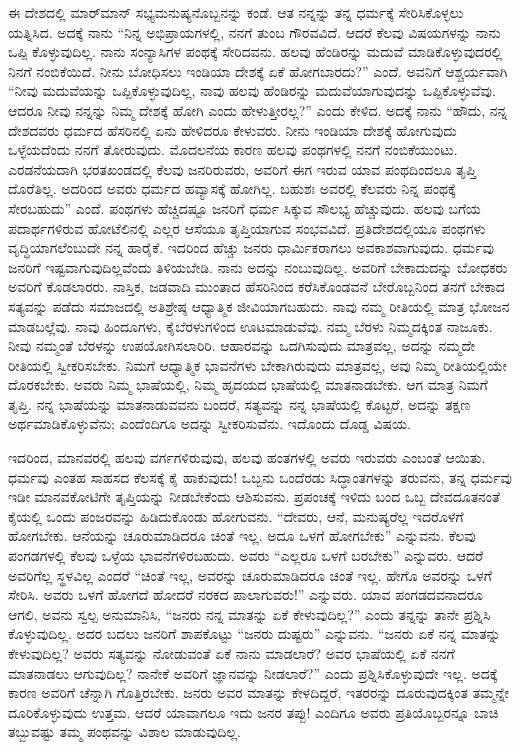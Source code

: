 ಈ ದೇಶದಲ್ಲಿ ಮಾರ್​ಮಾನ್​ ಸಭ್ಯಮನುಷ್ಯನೊಬ್ಬನನ್ನು ಕಂಡೆ. ಆತ ನನ್ನನ್ನು ತನ್ನ ಧರ್ಮಕ್ಕೆ ಸೇರಿಸಿಕೊಳ್ಳಲು ಯತ್ನಿಸಿದ. ಅದಕ್ಕೆ ನಾನು “ನಿನ್ನ ಅಭಿಪ್ರಾಯಗಳಲ್ಲಿ, ನನಗೆ ತುಂಬ ಗೌರವವಿದೆ. ಆದರೆ ಕೆಲವು ವಿಷಯಗಳನ್ನು ನಾನು ಒಪ್ಪಿ ಕೊಳ್ಳುವುದಿಲ್ಲ. ನಾನು ಸಂನ್ಯಾಸಿಗಳ ಪಂಥಕ್ಕೆ ಸೇರಿದವನು. ಹಲವು ಹೆಂಡಿರನ್ನು ಮದುವೆ ಮಾಡಿಕೊಳ್ಳುವುದರಲ್ಲಿ ನಿನಗೆ ನಂಬಿಕೆಯಿದೆ. ನೀನು ಬೋಧಿಸಲು ಇಂಡಿಯಾ ದೇಶಕ್ಕೆ ಏಕೆ ಹೋಗಬಾರದು?” ಎಂದೆ. ಅವನಿಗೆ ಆಶ್ಚರ್ಯವಾಗಿ “ನೀವು ಮದುವೆಯನ್ನು ಒಪ್ಪಿಕೊಳ್ಳುವುದಿಲ್ಲ, ನಾವು ಹಲವು ಹೆಂಡಿರನ್ನು ಮದುವೆಯಾಗುವುದನ್ನು ಒಪ್ಪಿಕೊಳ್ಳುವೆವು. ಆದರೂ ನೀವು ನನ್ನನ್ನು ನಿಮ್ಮ ದೇಶಕ್ಕೆ ಹೋಗಿ ಎಂದು ಹೇಳುತ್ತೀರಲ್ಲ?” ಎಂದು ಕೇಳಿದ. ಅದಕ್ಕೆ ನಾನು “ಹೌದು, ನನ್ನ ದೇಶದವರು ಧರ್ಮದ ಹೆಸರಿನಲ್ಲಿ ಏನು ಹೇಳಿದರೂ ಕೇಳುವರು. ನೀನು ಇಂಡಿಯಾ ದೇಶಕ್ಕೆ ಹೋಗುವುದು ಒಳ್ಳೆಯದೆಂದು ನನಗೆ ತೋರುವುದು. ಮೊದಲನೆಯ ಕಾರಣ ಹಲವು ಪಂಥಗಳಲ್ಲಿ ನನಗೆ ನಂಬಿಕೆಯುಂಟು. ಎರಡನೆಯದಾಗಿ ಭರತಖಂಡದಲ್ಲಿ ಕೆಲವು ಜನರಿರುವರು, ಅವರಿಗೆ ಈಗ ಇರುವ ಯಾವ ಪಂಥದಿಂದಲೂ ತೃಪ್ತಿ ದೊರೆತಿಲ್ಲ. ಅದರಿಂದ ಅವರು ಧರ್ಮದ ಹವ್ಯಾಸಕ್ಕೆ ಹೋಗಿಲ್ಲ. ಬಹುಶಃ ಅವರಲ್ಲಿ ಕೆಲವರು ನಿನ್ನ ಪಂಥಕ್ಕೆ ಸೇರಬಹುದು” ಎಂದೆ. ಪಂಥಗಳು ಹೆಚ್ಚಿದಷ್ಟೂ ಜನರಿಗೆ ಧರ್ಮ ಸಿಕ್ಕುವ ಸೌಲಭ್ಯ ಹೆಚ್ಚುವುದು. ಹಲವು ಬಗೆಯ ಪದಾರ್ಥಗಳಿರುವ ಹೋಟೆಲಿನಲ್ಲಿ ಎಲ್ಲರ ಆಸೆಯೂ ತೃಪ್ತಿಯಾಗುವ ಸಂಭವವಿದೆ. ಪ್ರತಿದೇಶದಲ್ಲಿಯೂ ಪಂಥಗಳು ವೃದ್ಧಿಯಾಗಲೆಂಬುದೇ ನನ್ನ ಹಾರೈಕೆ. ಇದರಿಂದ ಹೆಚ್ಚು ಜನರು ಧಾರ್ಮಿಕರಾಗಲು ಅವಕಾಶವಾಗುವುದು. ಧರ್ಮವು ಜನರಿಗೆ ಇಷ್ಟವಾಗುವುದಿಲ್ಲವೆಂದು ತಿಳಿಯಬೇಡಿ. ನಾನು ಅದನ್ನು ನಂಬುವುದಿಲ್ಲ. ಅವರಿಗೆ ಬೇಕಾದುದನ್ನು ಬೋಧಕರು ಅವರಿಗೆ ಕೊಡಲಾರರು. ನಾಸ್ತಿಕ, ಜಡವಾದಿ ಮುಂತಾದ ಹೆಸರಿನಿಂದ ಕರೆಸಿಕೊಂಡವನೆ ಬೇರೊಬ್ಬನಿಂದ ತನಗೆ ಬೇಕಾದ ಸತ್ಯವನ್ನು ಪಡೆದು ಸಮಾಜದಲ್ಲಿ ಅತಿಶ್ರೇಷ್ಠ ಆಧ್ಯಾತ್ಮಿಕ ಜೀವಿಯಾಗಬಹುದು. ನಾವು ನಮ್ಮ ರೀತಿಯಲ್ಲಿ ಮಾತ್ರ ಭೋಜನ ಮಾಡಬಲ್ಲೆವು. ನಾವು ಹಿಂದೂಗಳು, ಕೈಬೆರಳುಗಳಿಂದ ಊಟಮಾಡುವೆವು. ನಮ್ಮ ಬೆರಳು ನಿಮ್ಮದಕ್ಕಿಂತ ನಾಜೂಕು. ನೀವು ನಮ್ಮಂತೆ ಬೆರಳನ್ನು ಉಪಯೋಗಿಸಲಾರಿರಿ. ಆಹಾರವನ್ನು ಒದಗಿಸುವುದು ಮಾತ್ರವಲ್ಲ, ಅದನ್ನು ನಮ್ಮದೇ ರೀತಿಯಲ್ಲಿ ಸ್ವೀಕರಿಸಬೇಕು. ನಿಮಗೆ ಆಧ್ಯಾತ್ಮಿಕ ಭಾವನೆಗಳು ಬೇಕಾಗಿರುವುದು ಮಾತ್ರವಲ್ಲ, ಅವು ನಿಮ್ಮ ರೀತಿಯಲ್ಲಿಯೇ ದೊರಕಬೇಕು. ಅವರು ನಿಮ್ಮ ಭಾಷೆಯಲ್ಲಿ, ನಿಮ್ಮ ಹೃದಯದ ಭಾಷೆಯಲ್ಲಿ ಮಾತನಾಡಬೇಕು. ಆಗ ಮಾತ್ರ ನಿಮಗೆ ತೃಪ್ತಿ. ನನ್ನ ಭಾಷೆಯನ್ನು ಮಾತನಾಡುವವನು ಬಂದರೆ, ಸತ್ಯವನ್ನು ನನ್ನ ಭಾಷೆಯಲ್ಲಿ ಕೊಟ್ಟರೆ, ಅದನ್ನು ತಕ್ಷಣ ಅರ್ಥಮಾಡಿಕೊಳ್ಳುವೆನು; ಎಂದೆಂದಿಗೂ ಅದನ್ನು ಸ್ವೀಕರಿಸುವೆನು. ಇದೊಂದು ದೊಡ್ಡ ವಿಷಯ.


ಇದರಿಂದ, ಮಾನವರಲ್ಲಿ ಹಲವು ವರ್ಗಗಳಿರುವುವು, ಹಲವು ಹಂತಗಳಲ್ಲಿ ಅವರು ಇರುವರು ಎಂಬಂತೆ ಆಯಿತು. ಧರ್ಮವು ಎಂತಹ ಸಾಹಸದ ಕೆಲಸಕ್ಕೆ ಕೈ ಹಾಕುವುದು! ಒಬ್ಬನು ಒಂದೆರಡು ಸಿದ್ಧಾಂತಗಳನ್ನು ತರುವನು, ತನ್ನ ಧರ್ಮವು ಇಡೀ ಮಾನವಕೋಟಿಗೇ ತೃಪ್ತಿಯನ್ನು ನೀಡಬೇಕೆಂದು ಆಶಿಸುವನು. ಪ್ರಪಂಚಕ್ಕೆ ಇಳಿದು ಬಂದ ಒಬ್ಬ ದೇವದೂತನಂತೆ ಕೈಯಲ್ಲಿ ಒಂದು ಪಂಜರವನ್ನು ಹಿಡಿದುಕೊಂಡು ಹೋಗುವನು. “ದೇವರು, ಆನೆ, ಮನುಷ್ಯರೆಲ್ಲ ಇದರೊಳಗೆ ಹೋಗಬೇಕು. ಆನೆಯನ್ನು ಚೂರುಮಾಡಿದರೂ ಚಿಂತೆ ಇಲ್ಲ. ಅದೂ ಒಳಗೆ ಹೋಗಬೇಕು” ಎನ್ನುವನು. ಕೆಲವು ಪಂಗಡಗಳಲ್ಲಿ ಕೆಲವು ಒಳ್ಳೆಯ ಭಾವನೆಗಳಿರಬಹುದು. ಅವರು “ಎಲ್ಲರೂ ಒಳಗೆ ಬರಬೇಕು” ಎನ್ನುವರು. ಆದರೆ ಅವರಿಗೆಲ್ಲ ಸ್ಥಳವಿಲ್ಲ ಎಂದರೆ “ಚಿಂತೆ ಇಲ್ಲ, ಅವರನ್ನು ಚೂರುಮಾಡಿದರೂ ಚಿಂತೆ ಇಲ್ಲ. ಹೇಗೊ ಅವರನ್ನು ಒಳಗೆ ಸೇರಿಸಿ. ಅವರು ಒಳಗೆ ಹೋಗದೆ ಹೋದರೆ ನರಕದ ಪಾಲಾಗುವರು!” ಎನ್ನುವರು. ಯಾವ ಪಂಗಡದವನಾದರೂ ಆಗಲಿ, ಅವನು ಸ್ವಲ್ಪ ಅನುಮಾನಿಸಿ, “ಜನರು ನನ್ನ ಮಾತನ್ನು ಏಕೆ ಕೇಳುವುದಿಲ್ಲ?” ಎಂದು ತನ್ನನ್ನು ತಾನೇ ಪ್ರಶ್ನಿಸಿ ಕೊಳ್ಳುವುದಿಲ್ಲ. ಅದರ ಬದಲು ಜನರಿಗೆ ಶಾಪಕೊಟ್ಟು “ಜನರು ದುಷ್ಟರು” ಎನ್ನುವನು. “ಜನರು ಏಕೆ ನನ್ನ ಮಾತನ್ನು ಕೇಳುವುದಿಲ್ಲ? ಅವರು ಸತ್ಯವನ್ನು ನೋಡುವಂತೆ ಏಕೆ ನಾನು ಮಾಡಲಾರೆ? ಅವರ ಭಾಷೆಯಲ್ಲಿ ಏಕೆ ನನಗೆ ಮಾತನಾಡಲು ಆಗುವುದಿಲ್ಲ? ನಾನೇಕೆ ಅವರಿಗೆ ಜ್ಞಾನವನ್ನು ನೀಡಲಾರೆ?” ಎಂದು ಪ್ರಶ್ನಿಸಿಕೊಳ್ಳುವುದೇ ಇಲ್ಲ. ಅದಕ್ಕೆ ಕಾರಣ ಅವರಿಗೆ ಚೆನ್ನಾಗಿ ಗೊತ್ತಿರ\break ಬೇಕು. ಜನರು ಅವರ ಮಾತನ್ನು ಕೇಳದಿದ್ದರೆ, ಇತರರನ್ನು ದೂರುವುದಕ್ಕಿಂತ ತಮ್ಮನ್ನೇ ದೂರಿಕೊಳ್ಳುವುದು ಉತ್ತಮ. ಆದರೆ ಯಾವಾಗಲೂ ಇದು ಜನರ ತಪ್ಪು! ಎಂದಿಗೂ ಅವರು ಪ್ರತಿಯೊಬ್ಬರನ್ನೂ ಬಾಚಿ ತಬ್ಬುವಷ್ಟು ತಮ್ಮ ಪಂಥವನ್ನು ವಿಶಾಲ ಮಾಡುವುದಿಲ್ಲ.

